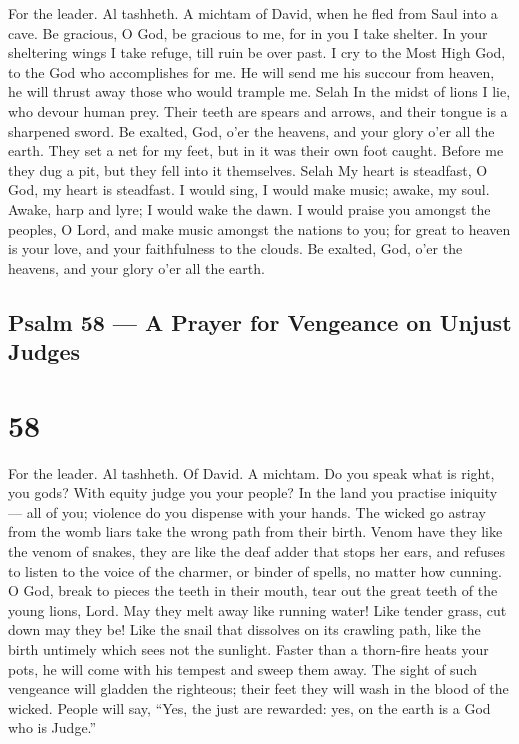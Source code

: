 For the leader. Al tashheth. A michtam of David, when he fled from Saul
into a cave.  Be gracious, O God, be gracious to me, for in
you I take shelter. In your sheltering wings I take refuge, till ruin be
over past.  I cry to the Most High God, to the God who
accomplishes for me.  He will send me his succour from
heaven, he will thrust away those who would trample me. Selah
 In the midst of lions I lie, who devour human prey. Their
teeth are spears and arrows, and their tongue is a sharpened sword.
 Be exalted, God, o'er the heavens, and your glory o'er all
the earth.  They set a net for my feet, but in it was their
own foot caught. Before me they dug a pit, but they fell into it
themselves. Selah  My heart is steadfast, O God, my heart is
steadfast. I would sing, I would make music;  awake, my
soul. Awake, harp and lyre; I would wake the dawn.  I would
praise you amongst the peoples, O Lord, and make music amongst the
nations to you;  for great to heaven is your love, and your
faithfulness to the clouds.  Be exalted, God, o'er the
heavens, and your glory o'er all the earth.

\hypertarget{psalm-58-a-prayer-for-vengeance-on-unjust-judges}{%
\subsection{Psalm 58 --- A Prayer for Vengeance on Unjust
Judges}\label{psalm-58-a-prayer-for-vengeance-on-unjust-judges}}

\hypertarget{section-57}{%
\section{58}\label{section-57}}

For the leader. Al tashheth. Of David. A michtam.  Do you
speak what is right, you gods? With equity judge you your people?
 In the land you practise iniquity --- all of you; violence
do you dispense with your hands.  The wicked go astray from
the womb liars take the wrong path from their birth.  Venom
have they like the venom of snakes, they are like the deaf adder that
stops her ears,  and refuses to listen to the voice of the
charmer, or binder of spells, no matter how cunning.  O God,
break to pieces the teeth in their mouth, tear out the great teeth of
the young lions, Lord.  May they melt away like running
water! Like tender grass, cut down may they be!  Like the
snail that dissolves on its crawling path, like the birth untimely which
sees not the sunlight.  Faster than a thorn-fire heats your
pots, he will come with his tempest and sweep them away. 
The sight of such vengeance will gladden the righteous; their feet they
will wash in the blood of the wicked.  People will say,
``Yes, the just are rewarded: yes, on the earth is a God who is Judge.''

